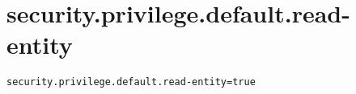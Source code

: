 \section{security.privilege.default.read-entity}
\label{configuration:SecurityPrivilegeDefaultReadEntity}
\ClearAPI
\TODO
{}
\begin{lstlisting}[style=Props,caption={Usage example for \textit{security.privilege.default.read-entity}}]
security.privilege.default.read-entity=true
\end{lstlisting}